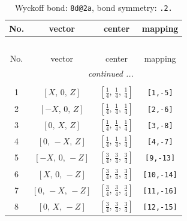 \documentclass[fleqn,8pt]{jsarticle}
\begin{document}
\begin{longtable}{cccc}
\caption{Wyckoff bond: {\tt 8d@2a}, bond symmetry: {\tt .2.}}
 \\
 \hline \hline
No. & vector & center & mapping \\ \hline \endfirsthead

\multicolumn{3}{l}{\tablename\ \thetable{}} \\
 \hline \hline
No. & vector & center & mapping \\ \hline \endhead

 \hline \hline
\multicolumn{3}{r}{\footnotesize\it continued ...} \\ \endfoot

 \hline \hline
\multicolumn{3}{r}{} \\ \endlastfoot

1 & $\left[ X,\, 0,\, Z \right]$ & $\left[ \frac{1}{4},\, \frac{1}{4},\, \frac{1}{4} \right]$ & {\tt [1,-5]} \\ \hline
2 & $\left[ - X,\, 0,\, Z \right]$ & $\left[ \frac{1}{4},\, \frac{1}{4},\, \frac{1}{4} \right]$ & {\tt [2,-6]} \\ \hline
3 & $\left[ 0,\, X,\, Z \right]$ & $\left[ \frac{1}{4},\, \frac{1}{4},\, \frac{1}{4} \right]$ & {\tt [3,-8]} \\ \hline
4 & $\left[ 0,\, - X,\, Z \right]$ & $\left[ \frac{1}{4},\, \frac{1}{4},\, \frac{1}{4} \right]$ & {\tt [4,-7]} \\ \hline
5 & $\left[ - X,\, 0,\, - Z \right]$ & $\left[ \frac{3}{4},\, \frac{3}{4},\, \frac{3}{4} \right]$ & {\tt [9,-13]} \\ \hline
6 & $\left[ X,\, 0,\, - Z \right]$ & $\left[ \frac{3}{4},\, \frac{3}{4},\, \frac{3}{4} \right]$ & {\tt [10,-14]} \\ \hline
7 & $\left[ 0,\, - X,\, - Z \right]$ & $\left[ \frac{3}{4},\, \frac{3}{4},\, \frac{3}{4} \right]$ & {\tt [11,-16]} \\ \hline
8 & $\left[ 0,\, X,\, - Z \right]$ & $\left[ \frac{3}{4},\, \frac{3}{4},\, \frac{3}{4} \right]$ & {\tt [12,-15]} \\
\end{longtable}
\renewcommand{\arraystretch}{1.2}
\end{document}

